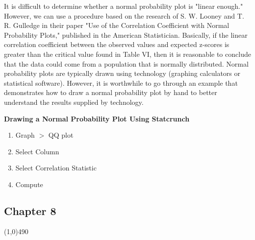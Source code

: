 \documentclass{report}
\begin{document}
    \bigbreak \noindent 
    It is difficult to determine whether a normal probability plot is "linear enough." However, we can use a procedure based on the research of S. W. Looney and T. R. Gulledge in their paper "Use of the Correlation Coefficient with Normal Probability Plots," published in the American Statistician. Basically, if the linear correlation coefficient between the observed values and expected z-scores is greater than the critical value found in Table VI, then it is reasonable to conclude that the data could come from a population that is normally distributed.
    \bigbreak \noindent 
    Normal probability plots are typically drawn using technology (graphing calculators or statistical software). However, it is worthwhile to go through an example that demonstrates how to draw a normal probability plot by hand to better understand the results supplied by technology.

    \pagebreak \bigbreak \noindent 
    \textbf{Drawing a Normal Probability Plot Using Statcrunch}
    \bigbreak \noindent 
    \begin{enumerate}
        \item Graph $> $ QQ plot
        \item Select Column
        \item Select Correlation Statistic
        \item Compute
    \end{enumerate}

    \pagebreak 
    \begin{center}
        \section*{Chapter 8}
    \end{center}
    \line(1,0){490}
    \bigbreak \noindent 
\end{document}
